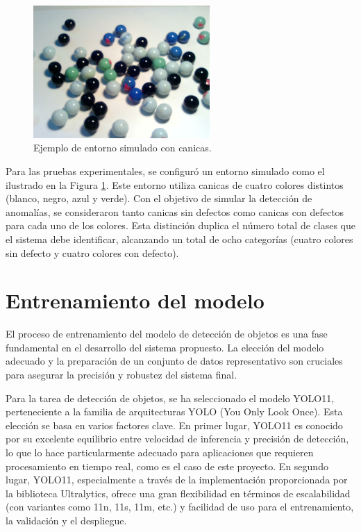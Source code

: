 \documentclass[11pt,spanish,listoffigures,listoftables]{tfgetsinf}
\begin{document}
\begin{figure}[H]
   \centering
   \includegraphics[width=0.6\textwidth]{images/diseno_e_implementacion/ejemplo_canicas.png}
   \caption{Ejemplo de entorno simulado con canicas.}
   \label{fig:entorno_simulado}
\end{figure}

Para las pruebas experimentales, se configuró un entorno simulado como el ilustrado en la Figura \ref{fig:entorno_simulado}. Este entorno utiliza canicas de cuatro colores distintos (blanco, negro, azul y verde). Con el objetivo de simular la detección de anomalías, se consideraron tanto canicas sin defectos como canicas con defectos para cada uno de los colores. Esta distinción duplica el número total de clases que el sistema debe identificar, alcanzando un total de ocho categorías (cuatro colores sin defecto y cuatro colores con defecto).


\section{Entrenamiento del modelo}

El proceso de entrenamiento del modelo de detección de objetos es una fase fundamental en el desarrollo del sistema propuesto. La elección del modelo adecuado y la preparación de un conjunto de datos representativo son cruciales para asegurar la precisión y robustez del sistema final.

Para la tarea de detección de objetos, se ha seleccionado el modelo YOLO11, perteneciente a la familia de arquitecturas YOLO (You Only Look Once). Esta elección se basa en varios factores clave. En primer lugar, YOLO11 es conocido por su excelente equilibrio entre velocidad de inferencia y precisión de detección, lo que lo hace particularmente adecuado para aplicaciones que requieren procesamiento en tiempo real, como es el caso de este proyecto. En segundo lugar, YOLO11, especialmente a través de la implementación proporcionada por la biblioteca Ultralytics, ofrece una gran flexibilidad en términos de escalabilidad (con variantes como 11n, 11s, 11m, etc.) y facilidad de uso para el entrenamiento, la validación y el despliegue.
\end{document}
